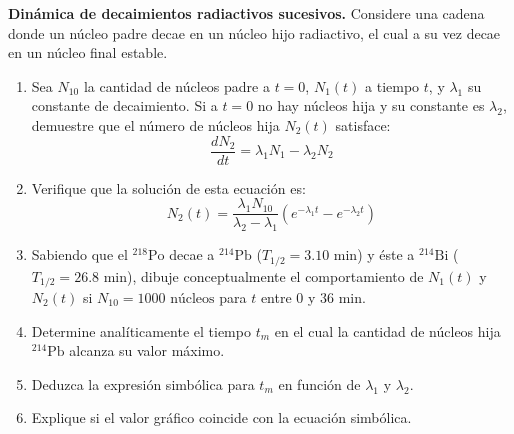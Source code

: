 \item \textbf{Dinámica de decaimientos radiactivos sucesivos.}
Considere una cadena donde un núcleo padre decae en un núcleo hijo radiactivo, el cual a su vez decae en un núcleo final estable.
\begin{enumerate}
    \item Sea $N_{10}$ la cantidad de núcleos padre a $t = 0$, $N_1(t)$ a tiempo $t$, y $\lambda_1$ su constante de decaimiento. Si a $t = 0$ no hay núcleos hija y su constante es $\lambda_2$, demuestre que el número de núcleos hija $N_2(t)$ satisface:
    $$ \frac{dN_2}{dt} = \lambda_1 N_1 - \lambda_2 N_2 $$
    \item Verifique que la solución de esta ecuación es:
    $$ N_2(t) = \frac{\lambda_1 N_{10}}{\lambda_2 - \lambda_1} \left( e^{-\lambda_1 t} - e^{-\lambda_2 t} \right) $$
    \item Sabiendo que el $^{218}\text{Po}$ decae a $^{214}\text{Pb}$ ($T_{1/2} = 3.10\text{ min}$) y éste a $^{214}\text{Bi}$ ($T_{1/2} = 26.8\text{ min}$), dibuje conceptualmente el comportamiento de $N_1(t)$ y $N_2(t)$ si $N_{10} = 1000\text{ núcleos}$ para $t$ entre $0$ y $36\text{ min}$.
    \item Determine analíticamente el tiempo $t_m$ en el cual la cantidad de núcleos hija $^{214}\text{Pb}$ alcanza su valor máximo.
    \item Deduzca la expresión simbólica para $t_m$ en función de $\lambda_1$ y $\lambda_2$.
    \item Explique si el valor gráfico coincide con la ecuación simbólica.
\end{enumerate}